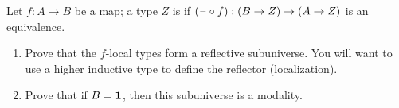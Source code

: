 \begin{ex}
  Let $f:A\to B$ be a map; a type $Z$ is 
  if $(\mathord{\hspace{1pt}\text{--}\hspace{1pt}}\circ f):(B\to Z) \to (A\to Z)$ is an equivalence.
  \begin{enumerate}
  \item Prove that the $f$-local types form a reflective subuniverse.
    You will want to use a higher inductive type to define the reflector (localization).
  \item Prove that if $B=\mathbf{1}$, then this subuniverse is a modality.
  \end{enumerate}
\end{ex}

